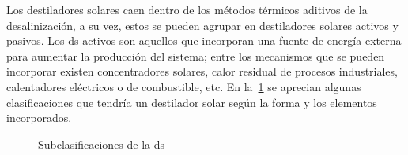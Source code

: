 		Los destiladores solares caen dentro de los métodos térmicos aditivos de la desalinización, a su vez, estos se pueden agrupar en destiladores solares activos y pasivos. Los \acrshort{ds} activos son aquellos que incorporan una fuente de energía externa para aumentar la producción del sistema; entre los mecanismos que se pueden incorporar existen concentradores solares, calor residual de procesos industriales, calentadores eléctricos o de combustible, etc. En la~\cref{fig:destilación-solar} se aprecian algunas clasificaciones que tendría un destilador solar según la forma y los elementos incorporados.
		
		\begin{figure}[H]
			\centering
			
			\caption{Subclasificaciones de la \acrlong{ds}}
			\label{fig:destilación-solar}
		\end{figure}
		
		